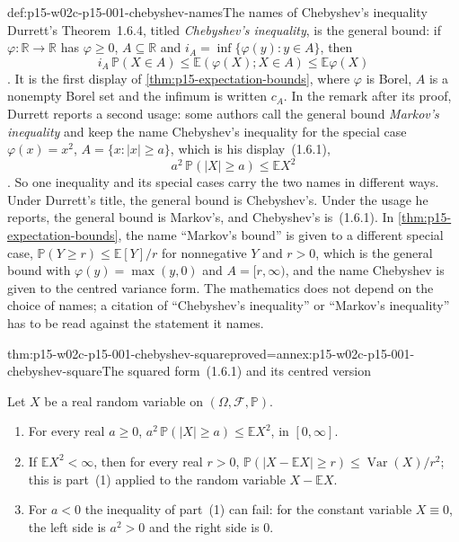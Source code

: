 \begin{hbconvention}{def:p15-w02c-p15-001-chebyshev-names}{The names of Chebyshev's inequality}
Durrett's Theorem~1.6.4, titled \emph{Chebyshev's inequality}, is the
general bound: if \(\varphi:\mathbb R\to\mathbb R\) has \(\varphi\geq0\),
\(A\subseteq\mathbb R\) and \(i_A=\inf\{\varphi(y):y\in A\}\), then
\[
 i_A\,\mathbb P(X\in A)\leq\mathbb E(\varphi(X);X\in A)\leq\mathbb E\varphi(X)
\]
\cite[thm.~1.6.4, p.~29]{DurrettPTEAuthor2019}. It is the first display of
\cref{thm:p15-expectation-bounds}, where \(\varphi\) is Borel, \(A\) is a
nonempty Borel set and the infimum is written \(c_A\). In the remark after
its proof, Durrett reports a second usage: some authors call the general
bound \emph{Markov's inequality} and keep the name Chebyshev's inequality
for the special case \(\varphi(x)=x^2\), \(A=\{x:|x|\geq a\}\), which is
his display~(1.6.1),
\[
 a^2\,\mathbb P(|X|\geq a)\leq\mathbb E X^2
\]
\cite[remark after thm.~1.6.4, p.~30]{DurrettPTEAuthor2019}.
So one inequality and its special cases carry the two names in different
ways. Under Durrett's title, the general bound is Chebyshev's. Under the
usage he reports, the general bound is Markov's, and Chebyshev's
is~(1.6.1). In \cref{thm:p15-expectation-bounds}, the name ``Markov's
bound'' is given to a different special case,
\(\mathbb P(Y\geq r)\leq\mathbb E[Y]/r\) for nonnegative \(Y\) and
\(r>0\), which is the general bound with \(\varphi(y)=\max(y,0)\) and
\(A=[r,\infty)\), and the name Chebyshev is given to the centred variance
form. The mathematics does not depend on the choice of names; a citation
of ``Chebyshev's inequality'' or ``Markov's inequality'' has to be read
against the statement it names.
\end{hbconvention}

\begin{hbcorollary}{thm:p15-w02c-p15-001-chebyshev-square}{proved=annex:p15-w02c-p15-001-chebyshev-square}{The squared form~(1.6.1) and its centred version}
\par\nobreak
Let \(X\) be a real random variable on \((\Omega,\mathcal F,\mathbb P)\).
\begin{enumerate}
\item For every real \(a\geq0\),
      \(a^2\,\mathbb P(|X|\geq a)\leq\mathbb E X^2\), in \([0,\infty]\).
\item If \(\mathbb E X^2<\infty\), then for every real \(r>0\),
      \(\mathbb P(|X-\mathbb E X|\geq r)\leq\operatorname{Var}(X)/r^2\); this
      is part~(1) applied to the random variable \(X-\mathbb E X\).
\item For \(a<0\) the inequality of part~(1) can fail: for the constant
      variable \(X\equiv0\), the left side is \(a^2>0\) and the right side
      is \(0\).
\end{enumerate}
\end{hbcorollary}

